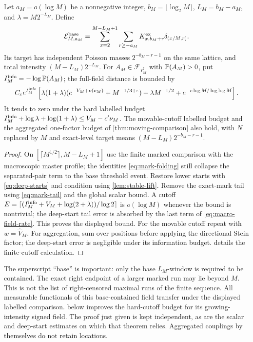 \begin{theorem}\label{thm:macro-field}
Let $a_M=o(\log M)$ be a nonnegative integer, $b_M=\lfloor\log_2M\rfloor$,
$L_M=b_M-a_M$, and $\lambda=M2^{-L_M}$. Define
\[
 \mathcal E^{\rm base}_{M,a_M}
 =\sum_{x=2}^{M-L_M+1}\sum_{r\ge-a_M}
             K^{\rm ex}_{x,b_M+r}\delta_{(x/M,r)}.
\]
Its target has independent Poisson masses $2^{-b_M-r-1}$ on the same
lattice, and total intensity $(M-L_M)2^{-L_M}$.
For $A_M\in\mathcal F_{Y_M^\sharp}$ with $\mathbb P(A_M)>0$, put
$I_M^{\rm info}=-\log\mathbb P(A_M)$;
the full-field distance is bounded by
\begin{equation}\label{eq:macro-field-rate}
 C_\varepsilon e^{I_M^{\rm info}}
 \left[\lambda(1+\lambda)(e^{-V_M+o(\nu_M)}+M^{-1/3+\varepsilon})
            +\lambda M^{-1/2}+e^{-c\log M/\log\log M}\right].
\end{equation}
It tends to zero under the hard labelled budget
$I_M^{\rm info}+\log\lambda+\log(1+\lambda)\le V_M-c'\nu_M$.
The movable-cutoff labelled budget and the aggregated one-factor budget
of \cref{thm:moving-comparison} also hold, with $N$ replaced by $M$ and
exact-level target means $(M-L_M)2^{-b_M-r-1}$.
\end{theorem}
\begin{proof}
On $[\lceil M^{1/2}\rceil,M-L_M+1]$ use the finite marked comparison
with the macroscopic master profile; the identities
\eqref{eq:mark-folding} still collapse the separated-pair term to the
base threshold event. Restore lower starts with \eqref{eq:deep-starts}
and condition using \cref{lem:stable-lift}. Remove the exact-mark tail
using \eqref{eq:mark-tail} and the global scalar bound. A cutoff
$E=\lceil(I_M^{\rm info}+V_M+\log(2+\lambda))/\log2\rceil$ is
$o(\log M)$ whenever the bound is nontrivial; the deep-start tail error
is absorbed by the last term of \eqref{eq:macro-field-rate}.
This proves the displayed bound.
For the movable cutoff repeat with $w=\widehat V_M$.
For aggregation, sum over positions before applying the directional Stein
factor; the deep-start error is negligible under its information
budget.  details the finite-cutoff calculation.
\end{proof}
The superscript ``base'' is important: only the base $L_M$-window is
required to be contained. The exact right endpoint of a larger marked run
may lie beyond $M$. This is not the list of right-censored maximal runs of
the finite sequence. All measurable functionals of this base-contained
field transfer under the displayed labelled comparison.
 below improves the hard-cutoff budget for its
growing-intensity signed field. The proof just given is kept independent,
as are the scalar and deep-start estimates on which that theorem relies.
Aggregated couplings by themselves do not retain locations.

